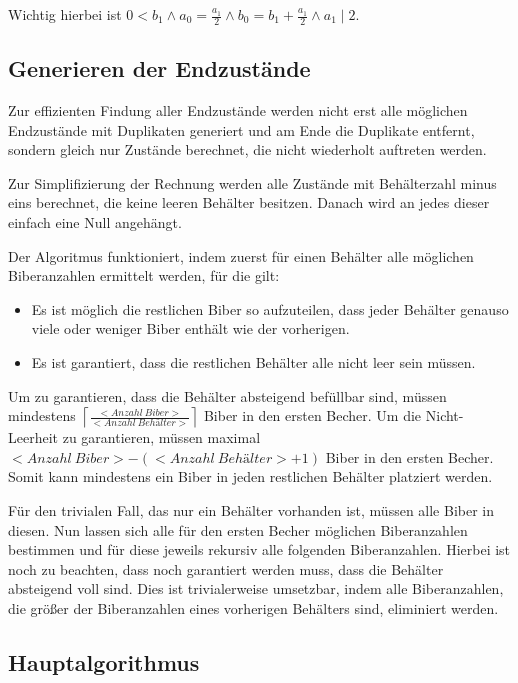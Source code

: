 \documentclass[a4paper,10pt,ngerman]{scrartcl}
\begin{document}
Wichtig hierbei ist \(0 < b_1 \land a_0 = \frac{a_1}{2} \land b_0 = b_1 + \frac{a_1}{2} \land a_1 \mid 2\).

\subsection{Generieren der Endzustände} \label{alg:target}

Zur effizienten Findung aller Endzustände werden nicht erst alle möglichen Endzustände mit Duplikaten generiert und am Ende die Duplikate entfernt, sondern gleich nur Zustände berechnet, die nicht wiederholt auftreten werden.

Zur Simplifizierung der Rechnung werden alle Zustände mit Behälterzahl minus eins berechnet, die keine leeren Behälter besitzen. Danach wird an jedes dieser einfach eine Null angehängt.

Der Algoritmus funktioniert, indem zuerst für einen Behälter alle möglichen Biberanzahlen ermittelt werden, für die gilt:

\begin{itemize}
    \item Es ist möglich die restlichen Biber so aufzuteilen, dass jeder Behälter genauso viele oder weniger Biber enthält wie der vorherigen.
    \item Es ist garantiert, dass die restlichen Behälter alle nicht leer sein müssen.
\end{itemize}

Um zu garantieren, dass die Behälter absteigend befüllbar sind, müssen mindestens \(\left\lceil\frac{<Anzahl\ Biber>}{<Anzahl\ Behälter>}\right\rceil\) Biber in den ersten Becher. 
Um die Nicht-Leerheit zu garantieren, müssen maximal \(<Anzahl\ Biber> - (<Anzahl\ Behälter> + 1)\) Biber in den ersten Becher. Somit kann mindestens ein Biber in jeden restlichen Behälter platziert werden.

Für den trivialen Fall, das nur ein Behälter vorhanden ist, müssen alle Biber in diesen.
Nun lassen sich alle für den ersten Becher möglichen Biberanzahlen bestimmen und für diese jeweils rekursiv alle folgenden Biberanzahlen. Hierbei ist noch zu beachten, dass noch garantiert werden muss, dass die Behälter absteigend voll sind. Dies ist trivialerweise umsetzbar, indem alle Biberanzahlen, die größer der Biberanzahlen eines vorherigen Behälters sind, eliminiert werden.

\subsection{Hauptalgorithmus}
\end{document}
